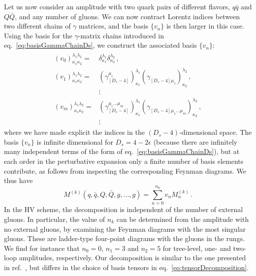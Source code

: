 Let us now consider an amplitude with two quark pairs of 
different flavors, $q\bar q$ and $Q\bar Q$, and any number of
gluons. We can now contract Lorentz indices between two 
different chains of $\gamma$ matrices, and the basis 
$\{v_n\}$ is then larger in this case. Using the basis for the
$\gamma$-matrix chains introduced in 
eq.~\eqref{eq:basisGammaChainDs}, we construct the associated
basis $\{v_n\}$:
%
\begin{align}\begin{split} \label{eqn:4qtensors}
  (v_0)_{\kappa_1\kappa_2}^{\lambda_1\lambda_2}   = &
  \delta_{\kappa_1}^{\lambda_1} \delta_{\kappa_2}^{\lambda_2}\,, \\
  (v_1)_{\kappa_1\kappa_2}^{\lambda_1\lambda_2}=
  &(\gamma_{[D_s-4]}^{\mu_1} )_{\kappa_1}^{\lambda_1} 
  (\gamma_{[D_s-4]\mu_1}^{\phantom{\mu}})_{\kappa_2}^{\lambda_2}\,, \\
  & \vdots\\
  (v_m)_{\kappa_1\kappa_2}^{\lambda_1\lambda_2}=
  &(\gamma_{[D_s-4]}^{\mu_1 \ldots  \mu_m})_{\kappa_1}^{\lambda_1}
  (\gamma_{[D_s-4]\mu_1 \ldots \mu_m}^{\phantom{\mu}})_{\kappa_2}^{\lambda_2}\,,\\
  & \vdots\,
\end{split}\end{align}
%
where we have made explicit the indices in the $
(D_s-4)$-dimensional space.
The basis $\{v_n\}$ is infinite dimensional for
$D_s=4-2\epsilon$ (because there are infinitely many independent
terms of the form of eq.~\eqref{eq:basisGammaChainDs}), but at
each order in the perturbative
expansion only a finite number of basis elements contribute, 
as follows from inspecting the corresponding Feynman diagrams.
We thus have
\begin{equation} \label{eqn:4qampltensor}
	M^{(k)}
	(q,\bar q,Q,\bar Q,g,\ldots,g)
	=\sum_{n=0}^{n_k}
    v_n
	M^{(k)}_n\,.
\end{equation}
In the HV scheme, the decomposition is independent of the number
of external gluons. In particular,
the value of $n_k$ can be determined from the amplitude with no 
external gluons, by examining the Feynman diagrams
with the most singular gluons. 
These are ladder-type four-point diagrams with the 
gluons in the rungs. We find for instance that $n_0=0$,
$n_1=3$ and $n_2=5$ for tree-level, one- and two-loop
amplitudes, respectively. Our decomposition is similar to the 
one presented in ref.~\cite{Glover:2004si}, but differs in the
choice of basis tensors in eq.~\eqref{eq:tensorDecomposition}.


